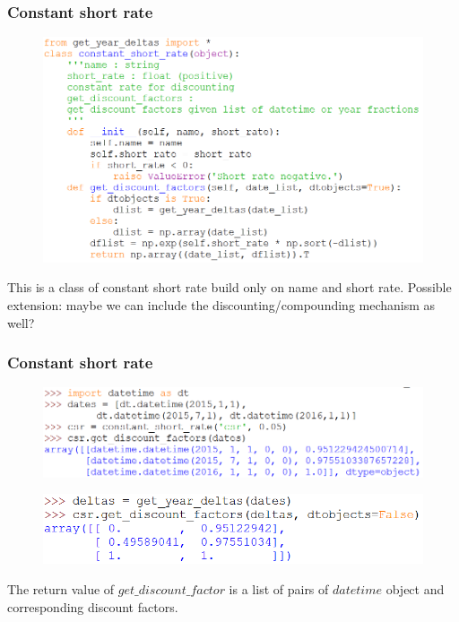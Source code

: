\documentclass{beamer}
\begin{document}
\begin{frame}
\frametitle{Constant short rate}
\begin{figure}[H]
	\includegraphics[scale=0.43]{constant_short_rate.png}
\end{figure}
This is a class of constant short rate build only on name and short rate.
Possible extension: maybe we can include the discounting/compounding mechanism as well?
\end{frame}

\begin{frame}
\frametitle{Constant short rate}
\begin{figure}[H]
	\includegraphics[scale=0.45]{constant_short_rate_example1.png}
\end{figure}
\begin{figure}[H]
	\includegraphics[scale=0.45]{constant_short_rate_example2.png}
\end{figure}
The return value of $get\_discount\_factor$ is a list of pairs of $datetime$ object and corresponding discount factors.
\end{frame}
\end{document}
